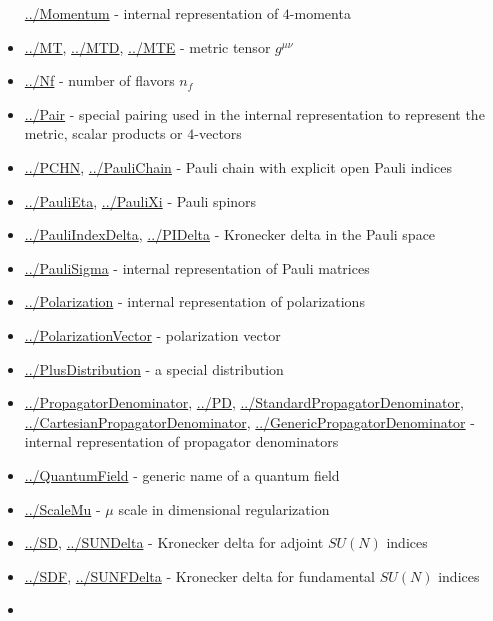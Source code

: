 \documentclass[../FeynCalcManual.tex]{subfiles}
\begin{document}
\begin{itemize}
  \hyperlink{../momentum}{../Momentum} - internal representation of
  \(4\)-momenta
\item
  \hyperlink{../mt}{../MT}, \hyperlink{../mtd}{../MTD},
  \hyperlink{../mte}{../MTE} - metric tensor \(g^{\mu \nu}\)
\item
  \hyperlink{../nf}{../Nf} - number of flavors \(n_f\)
\item
  \hyperlink{../pair}{../Pair} - special pairing used in the internal
  representation to represent the metric, scalar products or
  \(4\)-vectors
\item
  \hyperlink{../pchn}{../PCHN}, \hyperlink{../paulichain}{../PauliChain}
  - Pauli chain with explicit open Pauli indices
\item
  \hyperlink{../paulieta}{../PauliEta},
  \hyperlink{../paulixi}{../PauliXi} - Pauli spinors
\item
  \hyperlink{../pauliindexdelta}{../PauliIndexDelta},
  \hyperlink{../pidelta}{../PIDelta} - Kronecker delta in the Pauli
  space
\item
  \hyperlink{../paulisigma}{../PauliSigma} - internal representation of
  Pauli matrices
\item
  \hyperlink{../polarization}{../Polarization} - internal representation
  of polarizations
\item
  \hyperlink{../polarizationvector}{../PolarizationVector} -
  polarization vector
\item
  \hyperlink{../plusdistribution}{../PlusDistribution} - a special
  distribution
\item
  \hyperlink{../propagatordenominator}{../PropagatorDenominator},
  \hyperlink{../pd}{../PD},
  \hyperlink{../standardpropagatordenominator}{../StandardPropagatorDenominator},
  \hyperlink{../cartesianpropagatordenominator}{../CartesianPropagatorDenominator},
  \hyperlink{../genericpropagatordenominator}{../GenericPropagatorDenominator}
  - internal representation of propagator denominators
\item
  \hyperlink{../quantumfield}{../QuantumField} - generic name of a
  quantum field
\item
  \hyperlink{../scalemu}{../ScaleMu} - \(\mu\) scale in dimensional
  regularization
\item
  \hyperlink{../sd}{../SD}, \hyperlink{../sundelta}{../SUNDelta} -
  Kronecker delta for adjoint \(SU(N)\) indices
\item
  \hyperlink{../sdf}{../SDF}, \hyperlink{../sunfdelta}{../SUNFDelta} -
  Kronecker delta for fundamental \(SU(N)\) indices
\item

\end{itemize}
\end{document}
